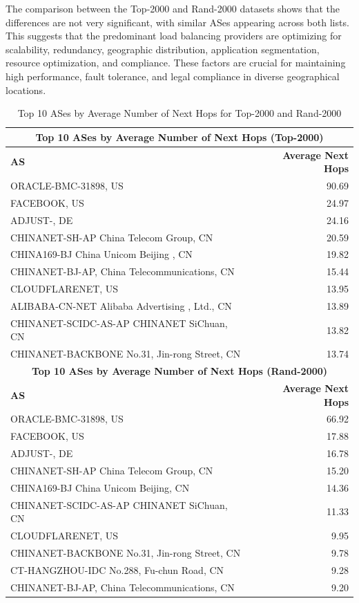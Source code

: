 \documentclass[12pt]{cwru_thesis}
\begin{document}
The comparison between the Top-2000 and Rand-2000 datasets shows that the differences are not very significant, with similar ASes appearing across both lists. This suggests that the predominant load balancing providers are optimizing for scalability, redundancy, geographic distribution, application segmentation, resource optimization, and compliance. These factors are crucial for maintaining high performance, fault tolerance, and legal compliance in diverse geographical locations.

\begin{table}[h!]
    \centering
    \begin{tabularx}{\textwidth}{|X|r|}
        \hline
        \multicolumn{2}{|c|}{\textbf{Top 10 ASes by Average Number of Next Hops (Top-2000)}} \\
        \hline
        \textbf{AS} & \textbf{Average Next Hops} \\
        \hline
        ORACLE-BMC-31898, US & 90.69 \\
        FACEBOOK, US & 24.97 \\
        ADJUST-, DE & 24.16 \\
        CHINANET-SH-AP China Telecom Group, CN & 20.59 \\
        CHINA169-BJ China Unicom Beijing , CN & 19.82 \\
        CHINANET-BJ-AP, China Telecommunications, CN & 15.44 \\
        CLOUDFLARENET, US & 13.95 \\
        ALIBABA-CN-NET Alibaba Advertising , Ltd., CN & 13.89 \\
        CHINANET-SCIDC-AS-AP CHINANET SiChuan, CN & 13.82 \\
        CHINANET-BACKBONE No.31, Jin-rong Street, CN & 13.74 \\
        \hline
        \multicolumn{2}{|c|}{\textbf{Top 10 ASes by Average Number of Next Hops (Rand-2000)}} \\
        \hline
        \textbf{AS} & \textbf{Average Next Hops} \\
        \hline
        ORACLE-BMC-31898, US & 66.92 \\
        FACEBOOK, US & 17.88 \\
        ADJUST-, DE & 16.78 \\
        CHINANET-SH-AP China Telecom Group, CN & 15.20 \\
        CHINA169-BJ China Unicom Beijing, CN & 14.36 \\
        CHINANET-SCIDC-AS-AP CHINANET SiChuan, CN & 11.33 \\
        CLOUDFLARENET, US & 9.95 \\
        CHINANET-BACKBONE No.31, Jin-rong Street, CN & 9.78 \\
        CT-HANGZHOU-IDC No.288, Fu-chun Road, CN & 9.28 \\
        CHINANET-BJ-AP, China Telecommunications, CN & 9.20 \\
        \hline
    \end{tabularx}
    \caption{Top 10 ASes by Average Number of Next Hops for Top-2000 and Rand-2000}
    \label{tab:as_next_hops}
\end{table}
\end{document}
